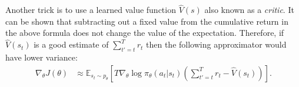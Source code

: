 Another trick is to use a learned value function $\hat{V}(s)$ also known as a \textit{critic}. It can be shown that subtracting out a fixed value from the cumulative return in the above formula does not change the value of the expectation. Therefore, if $\hat{V}(s_t)$ is a good estimate of $\sum_{t'=t}^T r_t$ then the following approximator would have lower variance:
\begin{align}
    \nabla_\theta J(\theta) &\approx \mathbb{E}_{s_t \sim p_\theta} \left[T \nabla_\theta \log \pi_\theta(a_t|s_t) \left( \sum_{t'=t}^T r_t - \hat{V}(s_t) \right) \right].
\end{align}